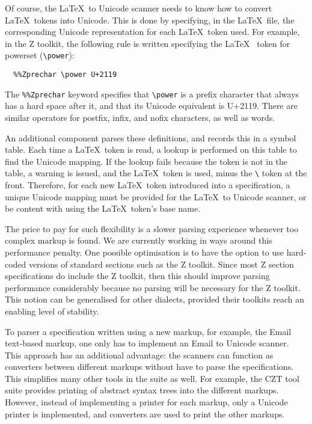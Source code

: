 \documentclass{llncs}
\begin{document}
Of course, the \LaTeX~to Unicode scanner needs to know how to convert
\LaTeX~tokens into Unicode. This is done by specifying, in the \LaTeX\ file,
the corresponding Unicode representation for each \LaTeX~token used. For example, in
the Z toolkit, the following rule is written specifying the \LaTeX~
token for powerset (\verb+\power+):
\begin{verbatim}
  %%Zprechar \power U+2119
\end{verbatim}

The {\tt \%\%Zprechar} keyword specifies that \verb+\power+ is a
prefix character that always has a hard space after it, and
that its Unicode equivalent is U+2119. There are similar operators for
postfix, infix, and nofix characters, as well as words.

An additional component parses these definitions, and records this in
a symbol table. Each time a \LaTeX~token is read, a lookup is
performed on this table to find the Unicode mapping. If the lookup
fails because the token is not in the table, a warning is issued, and
the \LaTeX~token is used, minus the \verb+\+ token at the
front. Therefore, for each new \LaTeX~token introduced into a
specification, a unique Unicode mapping must be provided for the
\LaTeX~to Unicode scanner, or be content with using the \LaTeX~token's
base name.

The price to pay for such flexibility is a slower parsing experience
whenever too complex markup is found.
We are currently working in ways around this performance penalty.
One possible optimisation is to have the option to use hard-coded versions
of standard sections such as the Z toolkit.
Since most Z section specifications do include the Z toolkit, then this should
improve parsing performance considerably because no parsing will be necessary for
the Z toolkit.
This notion can be generalised for other dialects, provided their toolkits reach
an enabling level of stability.

To parser a specification written using a new markup, for example, the
Email text-based markup, one only has to implement an Email to Unicode
scanner. This approach has an additional advantage: the scanners can function as
converters between different markups without have to parse the
specifications. This simplifies many other tools in the suite as
well. For example, the CZT tool suite provides printing of abstract
syntax trees into the different markups. However, instead of
implementing a printer for each markup, only a Unicode printer is
implemented, and converters are used to print the other markups.
\end{document}

